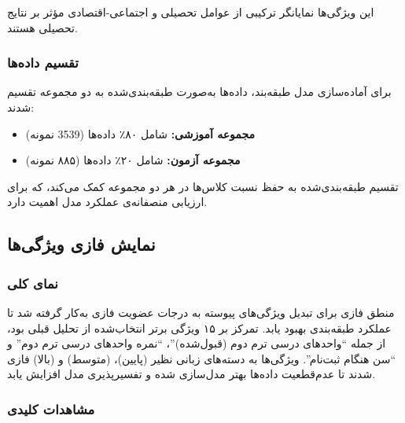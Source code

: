 این ویژگی‌ها نمایانگر ترکیبی از عوامل تحصیلی و اجتماعی-اقتصادی مؤثر بر نتایج تحصیلی هستند.

\subsubsection{تقسیم داده‌ها}

برای آماده‌سازی مدل طبقه‌بند، داده‌ها به‌صورت طبقه‌بندی‌شده به دو مجموعه تقسیم شدند:
\begin{itemize}
	\item \textbf{مجموعه آموزشی:} شامل ۸۰٪ داده‌ها (3539 نمونه)
	\item \textbf{مجموعه آزمون:} شامل ۲۰٪ داده‌ها (۸۸۵ نمونه)
\end{itemize}

تقسیم طبقه‌بندی‌شده به حفظ نسبت کلاس‌ها در هر دو مجموعه کمک می‌کند، که برای ارزیابی منصفانه‌ی عملکرد مدل اهمیت دارد.

\subsection{ نمایش فازی ویژگی‌ها}

\subsubsection{نمای کلی}

منطق فازی برای تبدیل ویژگی‌های پیوسته به درجات عضویت فازی به‌کار گرفته شد تا عملکرد طبقه‌بندی بهبود یابد. تمرکز بر ۱۵ ویژگی برتر انتخاب‌شده از تحلیل قبلی بود، از جمله ``واحدهای درسی ترم دوم (قبول‌شده)''، ``نمره واحدهای درسی ترم دوم'' و ``سن هنگام ثبت‌نام''. ویژگی‌ها به دسته‌های زبانی نظیر  (پایین)،  (متوسط) و  (بالا) فازی شدند تا عدم‌قطعیت داده‌ها بهتر مدل‌سازی شده و تفسیرپذیری مدل افزایش یابد.

\subsubsection{مشاهدات کلیدی}

